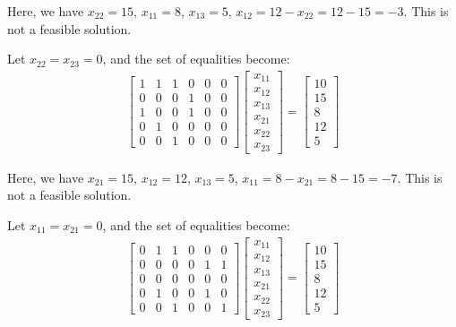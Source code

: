 \documentclass[letter,12pt]{article}
\begin{document}
Here, we have $x_{22} = 15$, $x_{11} = 8$, $x_{13} = 5$, $x_{12} = 12 - x_{22} = 12 - 15 = -3$. This is not a feasible solution.




Let $x_{22} = x_{23} = 0$, and the set of equalities become:
\begin{eqnarray*}
\left[
\begin{array}{cccccc}
1 & 1 & 1 & 0 & 0 & 0 \\
0 & 0 & 0 & 1 & 0 & 0 \\
1 & 0 & 0 & 1 & 0 & 0 \\
0 & 1 & 0 & 0 & 0 & 0 \\
0 & 0 & 1 & 0 & 0 & 0
\end{array}
\right]
\left[
\begin{array}{cccccc}
x_{11} \\
x_{12} \\
x_{13} \\
x_{21} \\
x_{22} \\
x_{23}
\end{array}
\right]
=
\left[
\begin{array}{cccccc}
10 \\
15 \\
8 \\
12 \\
5
\end{array}
\right]\end{eqnarray*}

Here, we have $x_{21} = 15$, $x_{12} = 12$, $x_{13} = 5$, $x_{11} = 8 - x_{21} = 8 - 15 = -7$. This is not a feasible solution.


Let $x_{11} = x_{21} = 0$, and the set of equalities become:
\begin{eqnarray*}
\left[
\begin{array}{cccccc}
0 & 1 & 1 & 0 & 0 & 0 \\
0 & 0 & 0 & 0 & 1 & 1 \\
0 & 0 & 0 & 0 & 0 & 0 \\
0 & 1 & 0 & 0 & 1 & 0 \\
0 & 0 & 1 & 0 & 0 & 1
\end{array}
\right]
\left[
\begin{array}{cccccc}
x_{11} \\
x_{12} \\
x_{13} \\
x_{21} \\
x_{22} \\
x_{23}
\end{array}
\right]
=
\left[
\begin{array}{cccccc}
10 \\
15 \\
8 \\
12 \\
5
\end{array}
\right]\end{eqnarray*}
\end{document}

